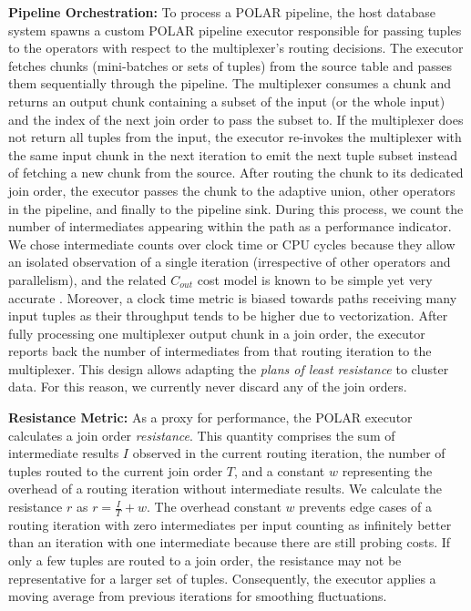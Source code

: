 \textbf{Pipeline Orchestration:} To process a POLAR pipeline, the host database system spawns a custom POLAR pipeline executor responsible for passing tuples to the operators with respect to the multiplexer's routing decisions. 
The executor fetches chunks (\ie mini-batches or sets of tuples) from the source table and passes them sequentially through the pipeline. The multiplexer consumes a chunk and returns an output chunk containing a subset of the input (or the whole input) and the index of the next join order to pass the subset to. If the multiplexer does not return all tuples from the input, the executor re-invokes the multiplexer with the same input chunk in the next iteration to emit the next tuple subset instead of fetching a new chunk from the source. After routing the chunk to its dedicated join order, the executor passes the chunk to the adaptive union, other operators in the pipeline, and finally to the pipeline sink.
During this process, we count the number of intermediates appearing within the path as a performance indicator. We chose intermediate counts over clock time or CPU cycles because they allow an isolated observation of a single iteration (irrespective of other operators and parallelism), and the related $C_{out}$ cost model is known to be simple yet very accurate \cite{moerkotte23, LeisGMBK015}. Moreover, a clock time metric is biased towards paths receiving many input tuples as their throughput tends to be higher due to vectorization. After fully processing one multiplexer output chunk in a join order, the executor reports back the number of intermediates from that routing iteration to the multiplexer. This design allows adapting the \emph{plans of least resistance} to cluster data. For this reason, we currently never discard any of the join orders.

\textbf{Resistance Metric:} As a proxy for performance, the POLAR executor calculates a join order \emph{resistance}. This quantity comprises the sum of intermediate results $I$ observed in the current routing iteration, the number of tuples routed to the current join order $T$, and a constant $w$ representing the overhead of a routing iteration without intermediate results. We calculate the resistance $r$ as ${r = \frac{I}{T} + w}$. The overhead constant $w$ prevents edge cases of a routing iteration with zero intermediates per input counting as infinitely better than an iteration with one intermediate because there are still probing costs. If only a few tuples are routed to a join order, the resistance may not be representative for a larger set of tuples. Consequently, the executor applies a moving average from previous iterations for smoothing fluctuations.


